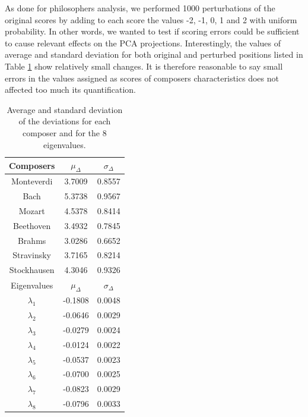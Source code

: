 \documentclass[
 aip,
 jmp,
 amsmath,amssymb,
 reprint,
]{revtex4-1}
\begin{document}
As done for philosophers analysis, we performed 1000 perturbations of
the original scores by adding to each score the values -2, -1, 0, 1 and 2 with
uniform probability. In other words, we wanted to test if scoring
errors could be sufficient to cause relevant effects
on the PCA projections. Interestingly, the values of average and
standard deviation for both original and perturbed positions listed in Table
\ref{tab:tableD} show relatively small changes. It is therefore
reasonable to say small errors in the values assigned as scores of composers
characteristics does not affected too much its quantification.

\begin{table}%
\caption{\label{tab:tableD}Average and standard deviation of the 
deviations for each composer and for the 
8 eigenvalues.}

\begin{tabular}{|c||c|c|}
\hline

Composers & $\mu_{\Delta}$ & $\sigma_{\Delta}$ \\
\hline

Monteverdi     & 3.7009 & 0.8557 \\
Bach           & 5.3738 & 0.9567 \\
Mozart         & 4.5378 & 0.8414 \\
Beethoven      & 3.4932 & 0.7845 \\
Brahms         & 3.0286 & 0.6652 \\
Stravinsky     & 3.7165 & 0.8214 \\
Stockhausen    & 4.3046 & 0.9326 \\
\hline \hline
Eigenvalues & $\mu_{\Delta}$ & $\sigma_{\Delta}$ \\
\hline
$\lambda_1$ &  -0.1808 & 0.0048 \\
$\lambda_2$ &  -0.0646 & 0.0029 \\
$\lambda_3$ &  -0.0279 & 0.0024 \\
$\lambda_4$ &  -0.0124 & 0.0022 \\
$\lambda_5$ &  -0.0537 & 0.0023 \\
$\lambda_6$ &  -0.0700 & 0.0025 \\
$\lambda_7$ &  -0.0823 & 0.0029 \\
$\lambda_8$ &  -0.0796 & 0.0033 \\
\hline

\end{tabular}
\end{table}
\end{document}
